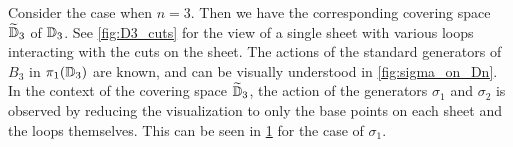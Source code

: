 \begin{example}\label{ex:Burau_D3}
    Consider the case when $n=3$. Then we have the corresponding covering space $\widetilde{\mathbb{D}}_3$ of $\mathbb{D}_3$. See \cref{fig:D3_cuts} for the view of a single sheet with various loops interacting with the cuts on the sheet. The actions of the standard generators of $B_3$ in $\pi_1(\mathbb{D}_3)$ are known, and can be visually understood in \cref{fig:sigma_on_Dn}. In the context of the covering space $\widetilde{\mathbb{D}}_3$, the action of the generators $\sigma_1$ and $\sigma_2$ is observed by reducing the visualization to only the base points on each sheet and the loops themselves. This can be seen in \cref{fig:Burau_D3} for the case of $\sigma_1$.
    
    \begin{figure}[h!]
        \centering
        
        \label{fig:Burau_D3}
    \end{figure}


\end{example}
